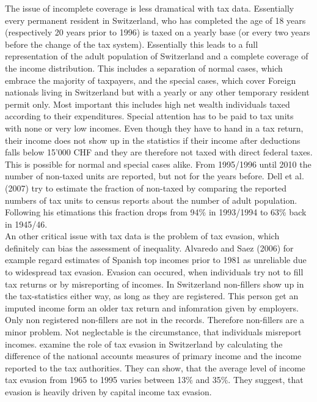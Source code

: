\documentclass[twoside]{article}\usepackage[]{graphicx}\usepackage[]{color}
\begin{document}
\begin{multicols}{2}
The issue of incomplete coverage is less dramatical with tax data. Essentially every permanent resident in Switzerland, who has completed the age of 18 years (respectively 20 years prior to 1996) is taxed on a yearly base (or every two years before the change of the tax system). Essentially this leads to a full representation of the adult population of Switzerland and a complete coverage of the income distribution. This includes a separation of normal cases, which embrace the majority of taxpayers, and the special cases, which cover Foreign nationals living in Switzerland but with a yearly or any other temporary resident permit only. Most important this includes high net wealth individuals taxed according to their expenditures. Special attention has to be paid to tax units with none or very low incomes. Even though they have to hand in a tax return, their income does not show up in the statistics if their income after deductions falls below 15'000 CHF and they are therefore not taxed with direct federal taxes. This is possible for normal and special cases alike. From 1995/1996 until 2010 the number of non-taxed units are reported, but not for the years before. Dell et al. (2007) try to estimate the fraction of non-taxed by comparing the reported numbers of tax units to census reports about the number of adult population. Following his etimations this fraction drops from 94\% in 1993/1994 to 63\% back in 1945/46. \\

An other critical issue with tax data is the problem of tax evasion, which definitely can bias the assessment of inequality. Alvaredo and Saez (2006) for example regard estimates of Spanish top incomes prior to 1981 as unreliable due to widespread tax evasion. Evasion can occured, when individuals try not to fill tax returns or by misreporting of incomes. In Switzerland non-fillers show up in the tax-statistics either way, as long as they are registered. This person get an imputed income form an older tax return and infomration given by employers. Only non registered non-fillers are not in the records. Therefore non-fillers are a minor problem. Not neglectable is the circumstance, that individuals misreport incomes. \citet{feld_tax_2006} examine the role of tax evasion in Switzerland by calculating the difference of the national accounts measures of primary income and the income reported to the tax authorities. They can show, that the average level of income tax evasion from 1965 to 1995 varies between 13\% and 35\%. They suggest, that evasion is heavily driven by capital income tax evasion. \\





\end{multicols}
\end{document}
